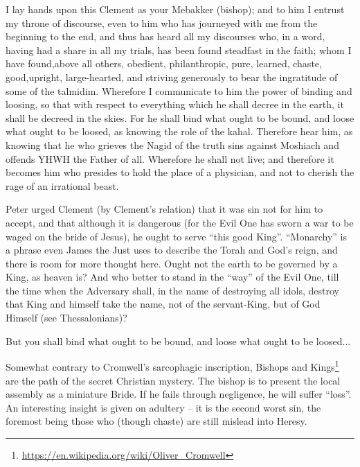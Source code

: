 \begin{quotex}
I lay hands upon this Clement as your Mebakker (bishop); and to him I entrust my throne of discourse, even to him who has journeyed with me from the beginning to the end, and thus has heard all my discourses who, in a word, having had a share in all my trials, has been found steadfast in the faith; whom I have found,above all others, obedient, philanthropic, pure, learned, chaste, good,upright, large-hearted, and striving generously to bear the ingratitude of some of the talmidim. Wherefore I communicate to him the power of binding and loosing, so that with respect to everything which he shall decree in the earth, it shall be decreed in the skies. For he shall bind what ought to be bound, and loose what ought to be loosed, as knowing the role of the kahal. Therefore hear him, as knowing that he who grieves the Nagid of the truth sins against Moshiach and offends YHWH the Father of all. Wherefore he shall not live; and therefore it becomes him who presides to hold the place of a physician, and not to cherish the rage of an irrational beast.
\end{quotex}


Peter urged Clement (by Clement's relation) that it was sin not for him to accept, and that although it is dangerous (for the Evil One has sworn a war to be waged on the bride of Jesus), he ought to serve ``this good King''. ``Monarchy'' is a phrase even James the Just uses to describe the Torah and God's reign, and there is room for more thought here. Ought not the earth to be governed by a King, as heaven is? And who better to stand in the ``way'' of the Evil One, till the time when the Adversary shall, in the name of destroying all idols, destroy that King and himself take the name, not of the servant-King, but of God Himself (see Thessalonians)?

\begin{quotex}
But you shall bind what ought to be bound, and loose what ought to be loosed... 
\end{quotex}

Somewhat contrary to Cromwell's sarcophagic inscription, Bishops and Kings\footnote{\url{https://en.wikipedia.org/wiki/Oliver\_Cromwell}} are the path of the secret Christian mystery. The bishop is to present the local assembly as a miniature Bride. If he fails through negligence, he will suffer ``loss''. An interesting insight is given on adultery -- it is the second worst sin, the foremost being those who (though chaste) are still mislead into Heresy.

